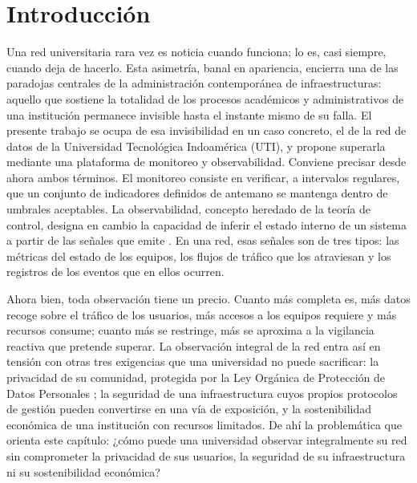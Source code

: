 \chapter{Introducción}
\label{chap:introduccion}

Una red universitaria rara vez es noticia cuando funciona; lo es, casi siempre, cuando deja de hacerlo. Esta asimetría, banal en apariencia, encierra una de las paradojas centrales de la administración contemporánea de infraestructuras: aquello que sostiene la totalidad de los procesos académicos y administrativos de una institución permanece invisible hasta el instante mismo de su falla. El presente trabajo se ocupa de esa invisibilidad en un caso concreto, el de la red de datos de la Universidad Tecnológica Indoamérica (UTI), y propone superarla mediante una plataforma de monitoreo y observabilidad. Conviene precisar desde ahora ambos términos. El monitoreo consiste en verificar, a intervalos regulares, que un conjunto de indicadores definidos de antemano se mantenga dentro de umbrales aceptables. La observabilidad, concepto heredado de la teoría de control, designa en cambio la capacidad de inferir el estado interno de un sistema a partir de las señales que emite \cite{kalman1960general, majors2022observability}. En una red, esas señales son de tres tipos: las métricas del estado de los equipos, los flujos de tráfico que los atraviesan y los registros de los eventos que en ellos ocurren.

Ahora bien, toda observación tiene un precio. Cuanto más completa es, más datos recoge sobre el tráfico de los usuarios, más accesos a los equipos requiere y más recursos consume; cuanto más se restringe, más se aproxima a la vigilancia reactiva que pretende superar. La observación integral de la red entra así en tensión con otras tres exigencias que una universidad no puede sacrificar: la privacidad de su comunidad, protegida por la Ley Orgánica de Protección de Datos Personales \cite{lopdp2021}; la seguridad de una infraestructura cuyos propios protocolos de gestión pueden convertirse en una vía de exposición, y la sostenibilidad económica de una institución con recursos limitados. De ahí la problemática que orienta este capítulo: ¿cómo puede una universidad observar integralmente su red sin comprometer la privacidad de sus usuarios, la seguridad de su infraestructura ni su sostenibilidad económica?

